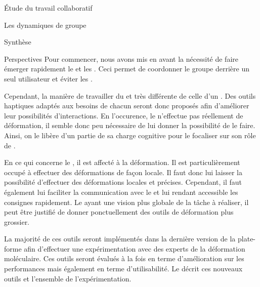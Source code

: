 \documentclass[myfrancais]{mythesis}
\begin{document}
\begin{mypart}{Étude du travail collaboratif}
\begin{mychapter}{Les dynamiques de groupe}
\begin{mysection}{Synthèse}
\begin{mysubsection}{Perspectives}
					Pour commencer, nous avons mis en avant la nécessité de faire émerger rapidement le  et les .
					Ceci permet de coordonner le groupe derrière un seul utilisateur et éviter les .

					Cependant, la manière de travailler du  et très différente de celle d'un .
					Des outils haptiques adaptés aux besoins de chacun seront donc proposés afin d'améliorer leur possibilités d'interactions.
					En l'occurence, le  n'effectue pas réellement de déformation, il semble donc peu nécessaire de lui donner la possibilité de le faire.
					Ainsi, on le libère d'un partie de sa charge cognitive pour le focaliser sur son rôle de .

					En ce qui concerne le , il est affecté à la déformation.
					Il est particulièrement occupé à effectuer des déformations de façon locale.
					Il faut donc lui laisser la possibilité d'effectuer des déformations locales et précises.
					Cependant, il faut également lui faciliter la communication avec le  et lui rendant accessible les consignes rapidement.
					Le  ayant une vision plus globale de la tâche à réaliser, il peut être justifié de donner ponctuellement des outils de déformation plus grossier.

					La majorité de ces outils seront implémentés dans la dernière version de la plate-forme afin d'effectuer une expérimentation avec des experts de la déformation moléculaire.
					Ces outils seront évalués à la fois en terme d'amélioration sur les performances mais également en terme d'utilisabilité.
					Le  décrit ces nouveaux outils et l'ensemble de l'expérimentation.
				\end{mysubsection}
			\end{mysection}
		\end{mychapter}
	\end{mypart}
\end{document}
